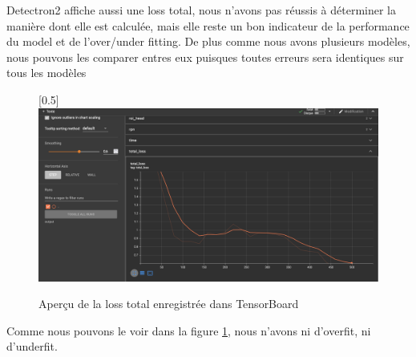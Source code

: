 Detectron2 affiche aussi une loss total, nous n'avons pas réussis à déterminer la manière dont elle est calculée, mais elle reste un bon indicateur de la performance du model et de l'over/under fitting. De plus comme nous avons plusieurs modèles, nous pouvons les comparer entres eux puisques toutes erreurs sera identiques sur tous les modèles
\begin{figure}[hb!]
    \centering
    \scalebox{0.5}[0.5]{\includegraphics[width=\textwidth]{images/loss_faster_rcnn.png}}
    \caption{Aperçu de la loss total enregistrée dans TensorBoard}
    \label{fig:loss_faster_rcnn}
\end{figure}
Comme nous pouvons le voir dans la figure \ref{fig:loss_faster_rcnn}, nous n'avons ni d'overfit, ni d'underfit.


